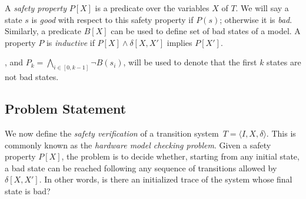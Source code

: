 A \textit{safety property} $P[X]$ is a predicate over the variables $X$ of $T$.  We will 
say a state $s$ is \textit{good} with respect to this safety property if $P(s)$; otherwise it is \textit{bad}. Similarly, a predicate $B[X]$ can be used to define set of bad states of a model.
A property $P$ is \textit{inductive} if $P[X] \wedge \delta[X,X']$ implies $P[X']$.    

%  
, and 
$P_k = \underset{i \in [0,k-1]}{\bigwedge} \neg B(s_i)$, will be used to denote that the 
first $k$ states are not bad states.    

\subsection{Problem Statement} 
%
We now define the \textit{safety verification} of a transition system~$T = \langle I,X,\delta\rangle$.
This is commonly known as the \textit{hardware model checking problem}.  
Given a safety property $P[X]$, the problem is to decide whether, starting from any initial state, a bad state can be reached following any sequence of transitions allowed by $\delta[X,X']$. In other words, is there an initialized trace of the system whose final state is bad?

